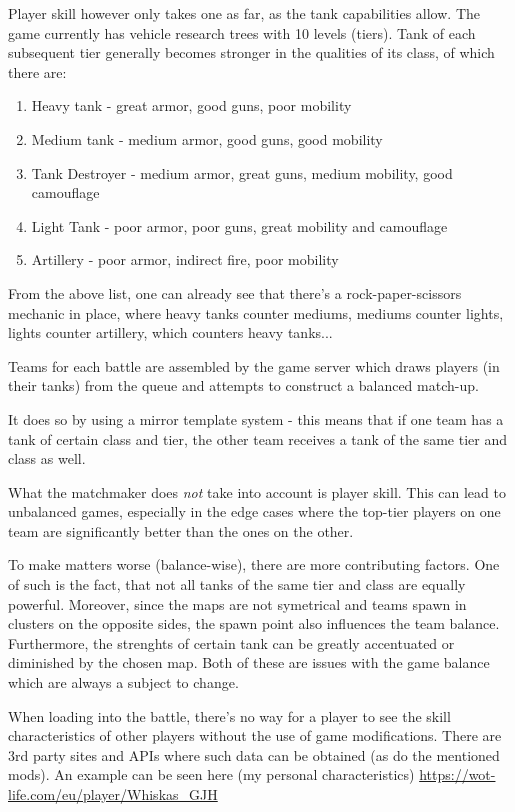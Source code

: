 \documentclass{report}
\begin{document}
Player skill however only takes one as far, as the tank capabilities allow. The game currently has vehicle research trees with 10 levels (tiers). Tank of each subsequent tier generally becomes stronger in the qualities of its class, of which there are:

\begin{enumerate}
	\item{Heavy tank - great armor, good guns, poor mobility}
	\item{Medium tank - medium armor, good guns, good mobility}
	\item{Tank Destroyer - medium armor, great guns, medium mobility, good camouflage}
	\item{Light Tank - poor armor, poor guns, great mobility and camouflage}
	\item{Artillery - poor armor, indirect fire, poor mobility}
\end{enumerate}

From the above list, one can already see that there's a rock-paper-scissors mechanic in place, where heavy tanks counter mediums, mediums counter lights, lights counter artillery, which counters heavy tanks...

Teams for each battle are assembled by the game server which draws players (in their tanks) from the queue and attempts to construct a balanced match-up.

It does so by using a mirror template system - this means that if one team has a tank of certain class and tier, the other team receives a tank of the same tier and class as well.

What the matchmaker does \emph{not} take into account is player skill. This can lead to unbalanced games, especially in the edge cases where the top-tier players on one team are significantly better than the ones on the other. 

To make matters worse (balance-wise), there are more contributing factors. One of such is the fact, that not all tanks of the same tier and class are equally powerful. Moreover, since the maps are not symetrical and teams spawn in clusters on the opposite sides, the spawn point also influences the team balance. Furthermore, the strenghts of certain tank can be greatly accentuated or diminished by the chosen map. Both of these are issues with the game balance which are always a subject to change.

When loading into the battle, there's no way for a player to see the skill characteristics of other players without the use of game modifications. There are 3rd party sites and APIs where such data can be obtained (as do the mentioned mods). An example can be seen here (my personal characteristics) 
\url{https://wot-life.com/eu/player/Whiskas_GJH}
\end{document}
